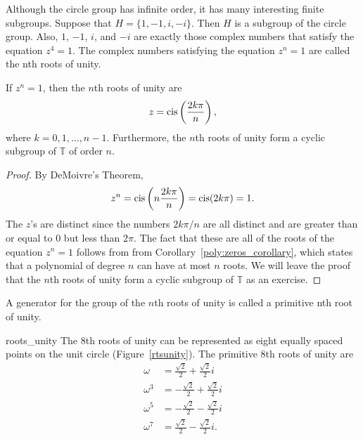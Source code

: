  
Although the circle group has infinite order, it has many interesting 
finite subgroups. Suppose that $H = \{ 1, -1, i, -i \}$. Then $H$ is a
subgroup of the circle group. Also, $1$, $-1$, $i$, and $-i$ are
exactly those complex numbers that satisfy the equation $z^4=1$. 
The complex numbers satisfying the equation $z^n=1$ are called
the {\bfi nth roots of unity}. 
 
 
\begin{theorem}
If $z^n = 1$, then the $n$th roots of unity are
\[
z = \operatorname{cis}\left( \frac{2 k \pi}{n } \right),
\]
where $k = 0, 1, \ldots, n-1$. Furthermore, the $n$th roots of unity
form a cyclic subgroup of\/ ${\mathbb T}$ of order $n$. 
\end{theorem}
 
 
\begin{proof}
By DeMoivre's Theorem,
\[
z^n = \operatorname{cis} \left( n \frac{2 k \pi}{n } \right) =
\operatorname{cis}( 2 k \pi ) = 1.
\]
The $z$'s are distinct since the numbers $2 k \pi /n$ are all
distinct and are greater than or equal to 0 but less than $2 \pi$.
The fact that these are all of the roots of the equation $z^n=1$
follows from from Corollary~\ref{poly:zeros_corollary}, which
states that a polynomial of degree $n$ can have at most $n$ roots.  We
will leave the proof that the $n$th roots of unity form a cyclic
subgroup of ${\mathbb T}$ as an exercise.
\end{proof}
 
 
\medskip
 
 
A generator for the group of the $n$th roots of unity is called a
{\bfi primitive nth root of unity}. 
 
 
\begin{example}{roots_unity}
The 8th roots of unity can be represented as
eight equally spaced points on the unit circle (Figure~\ref{rtsunity}).  The
primitive 8th roots of unity are
\begin{align*}
\omega & = \frac{\sqrt{2}}{2}  + \frac{\sqrt{2}}{2} i \\
\omega^3 & = -\frac{\sqrt{2}}{2}  + \frac{\sqrt{2}}{2} i \\
\omega^5 & = -\frac{\sqrt{2}}{2}  - \frac{\sqrt{2}}{2} i \\
\omega^7 & = \frac{\sqrt{2}}{2}  - \frac{\sqrt{2}}{2}i. 
\end{align*}
\end{example}
 
 

